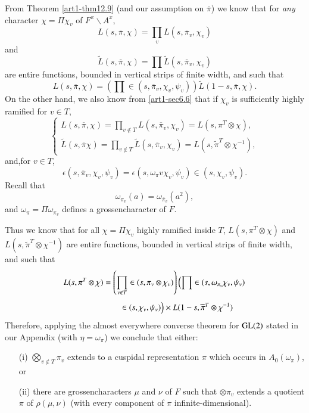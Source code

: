 From Theorem \ref{art1-thm12.9} (and our assumption on $\overline{\pi}$) we know that for {\em any} character $\chi=\Pi \chi_{v}$ of $F^{x}\backslash A^{x}$,
$$
L(s,\overline{\pi},\chi)=\prod\limits_{v}L(s,\overline{\pi}_{v},\chi_{v})
$$
and
$$
\widetilde{L}(s,\overline{\pi},\chi)=\prod \widetilde{L}(s,\overline{\pi}_{v},\chi_{v})
$$
are entire functions, bounded in vertical strips of finite width, and such that
\begin{equation}
L(s,\overline{\pi},\chi)=\left(\prod\in (s,\overline{\pi}_{v},\chi_{v},\psi_{v})\right)\widetilde{L}(1-s,\overline{\pi},\chi).\label{art1-eq15.3.4}
\end{equation}
On the other hand, we also know from \ref{art1-sec6.6} that if $\chi_{v}$ is sufficiently highly ramified for $v\in T$,
$$
\begin{cases}
L(s,\overline{\pi},\chi)=\prod\limits_{v\not\in T}L(s,\overline{\pi}_{v},\chi_{v})=L(s,\pi^{T}\otimes \chi),\\[4pt]
\widetilde{L}(s,\overline{\pi}\chi)=\prod\limits_{v\not\in T}\widetilde{L}(s,\overline{\pi}_{v},\chi_{v})=L(s,\widetilde{\pi}^{T}\otimes \chi^{-1}),
\end{cases}
$$
and,\pageoriginale for $v\in T$,
$$
\epsilon(s,\overline{\pi}_{v},\chi_{v},\psi_{v})=\epsilon(s,\omega_{\pi}v\chi_{v},\psi_{v})\in (s,\chi_{v},\psi_{v}).
$$
Recall that
\begin{equation}
\omega_{\pi_{v}}(a)=\omega_{\overline{\pi}_{v}}(a^{2}),\label{art1-eq15.3.5}
\end{equation}
and $\omega_{\pi}=\Pi \omega_{\pi_{v}}$ defines a grossencharacter of $F$.

Thus we know that for all $\chi=\Pi \chi_{v}$ highly ramified inside $T$, $L(s,\pi^{T}\otimes\chi)$ and $L(s,\widetilde{\pi}^{T}\otimes \chi^{-1})$ are entire functions, bounded in vertical strips of finite width, and such that
\begin{align}
L(s,\pi^{T}\otimes \chi) &= \left(\prod\limits_{v\not\in T}\in (s,\pi_{v}\otimes \chi_{v})\right)\left(\prod \in (s,\omega_{\pi_{v}}\chi_{v},\psi_{v})\right.\\[3pt]
&\qquad \in (s,\chi_{v},\psi_{v})\Big)\times L(1-s,\widetilde{\pi}^{T}\otimes \chi^{-1})\notag
\end{align}
Therefore, applying the almost everywhere converse theorem for $\mathrm{GL}(2)$ stated in our Appendix (with $\eta=\omega_{\pi}$) we conclude that either:
\begin{itemize}
\item[(i)] $\bigotimes\limits_{v\not\in T}\pi_{v}$ extends to a cuspidal representation $\pi$ which occurs in $A_{0}(\omega_{\pi})$, or

\item[(ii)] there are grossencharacters $\mu$ and $\nu$ of $F$ such that $\otimes \pi_{v}$ extends a quotient $\pi$ of $\rho(\mu,\nu)$ (with every component of $\pi$ infinite-dimen\-sional).
\end{itemize}


